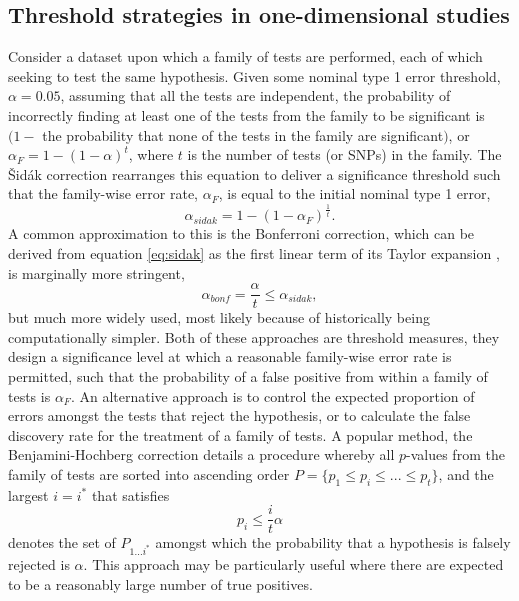 \subsection{Threshold strategies in one-dimensional studies}

Consider a dataset upon which a family of tests are performed, each of which seeking to test the same hypothesis. Given some nominal type 1 error threshold, $\alpha = 0.05$, assuming that all the tests are independent, the probability of incorrectly finding at least one of the tests from the family to be significant is $(1 -$ the probability that none of the tests in the family are significant$)$, or $\alpha_{F} = 1 - (1 - \alpha)^{t}$, where $t$ is the number of tests (or SNPs) in the family. The \v{S}id\'{a}k correction \citep{Sidak1967} rearranges this equation to deliver a significance threshold such that the family-wise error rate, $\alpha_{F}$, is equal to the initial nominal type 1 error,
\begin{equation}
\alpha_{sidak} = 1 - (1 - \alpha_{F})^{\frac{1}{t}}. \label{eq:sidak}
\end{equation}
A common approximation to this is the Bonferroni correction, which can be derived from equation \ref{eq:sidak} as the first linear term of its Taylor expansion \citep{Holm1979}, is marginally more stringent,
\begin{equation}
\alpha_{bonf} = \frac{\alpha}{t} \leq \alpha_{sidak},
\end{equation}
but much more widely used, most likely because of historically being computationally simpler. Both of these approaches are threshold measures, they design a significance level at which a reasonable family-wise error rate is permitted, such that the probability of a false positive from within a family of tests is $\alpha_{F}$. An alternative approach is to control the expected proportion of errors amongst the tests that reject the hypothesis, or to calculate the false discovery rate for the treatment of a family of tests. A popular method, the Benjamini-Hochberg correction \citep{Benjamini1995a} details a procedure whereby all $p$-values from the family of tests are sorted into ascending order $P = \{p_{1} \leq p_{i} \leq ... \leq p_{t}\}$, and the largest $i = i^*$ that satisfies
\begin{equation}
p_{i} \leq \frac{i}{t}\alpha
\end{equation}
denotes the set of $P_{1 ... i^*}$ amongst which the probability that a hypothesis is falsely rejected is $\alpha$. This approach may be particularly useful where there are expected to be a reasonably large number of true positives.

